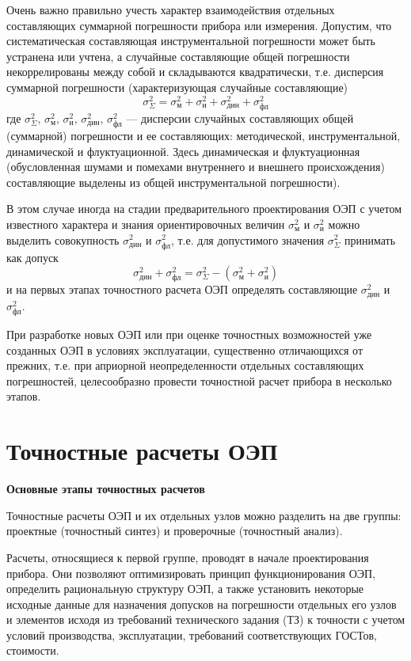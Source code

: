 Очень важно правильно учесть характер взаимодействия отдельных составляющих суммарной погрешности прибора или измерения. 
Допустим, что систематическая составляющая инструментальной погрешности может быть устранена или учтена, а случайные составляющие общей погрешности некоррелированы между собой и складываются квадратически, т.е. дисперсия суммарной погрешности (характеризующая случайные составляющие)
\[ \sigma^2_\Sigma = \sigma^2_\text{м} + \sigma^2_\text{и} + \sigma^2_\text{дин} + \sigma^2_\text{фл} \]
где $ \sigma^2_\Sigma,\, \sigma^2_\text{м},\,\sigma^2_\text{и},\,\sigma^2_\text{дин},\,\sigma^2_\text{фл} $ --- дисперсии случайных составляющих общей (суммарной) погрешности и ее составляющих: методической, инструментальной, динамической и флуктуационной. Здесь динамическая и флуктуационная (обусловленная шумами и помехами внутреннего и внешнего происхождения) составляющие выделены из общей инструментальной погрешности).

В этом случае иногда на стадии предварительного проектирования ОЭП с учетом известного характера и знания ориентировочных величин $ \sigma^2_\text{м} $ и $ \sigma^2_\text{и} $ можно выделить совокупность $ \sigma^2_\text{дин} $ и $ \sigma^2_\text{фл} $, т.е. для допустимого значения $ \sigma^2_\Sigma $ принимать как допуск
\[ \sigma^2_\text{дин} + \sigma^2_\text{фл} = \sigma^2_\Sigma - (\sigma^2_\text{м} + \sigma^2_\text{и})  \]
и на первых этапах точностного расчета ОЭП определять составляющие $ \sigma^2_\text{дин} $ и $ \sigma^2_\text{фл} $.

При разработке новых ОЭП или при оценке точностных возможностей уже созданных ОЭП в условиях эксплуатации, существенно отличающихся от прежних, т.е. при априорной неопределенности отдельных составляющих погрешностей, целесообразно провести точностной расчет прибора в несколько этапов.

\section{Точностные расчеты ОЭП}

\begin{flushleft}
\textbf{Основные этапы точностных расчетов}
\end{flushleft}

Точностные расчеты ОЭП и их отдельных узлов можно разделить на две группы: проектные (точностный синтез) и проверочные (точностный анализ).

Расчеты, относящиеся к первой группе, проводят в начале проектирования прибора. Они позволяют оптимизировать принцип функционирования ОЭП, определить рациональную структуру ОЭП, а также установить некоторые исходные данные для назначения допусков на погрешности отдельных его узлов и элементов исходя из требований технического задания (ТЗ) к точности с учетом условий производства, эксплуатации, требований соответствующих ГОСТов, стоимости.

